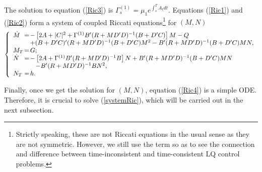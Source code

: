 \documentclass[final]{siamltex}
\begin{document}
The solution to equation (\ref{Ric3}) is $\Gamma^{(1)}_s=\mu_1 e^{\int_s^TA_tdt}$.
Equations (\ref{Ric1}) and (\ref{Ric2}) form a system of coupled Riccati equations\footnote{Strictly speaking, these are not
Riccati equations in the usual sense as they are not symmetric. However, we still use the term so as to see the connection and difference between
time-inconsistent and time-consistent LQ control problems.} for $(M,N)$
\begin{equation}\label{systemRic}
\left\{\begin{array}{lll}
\dot{M}\hspace{-0.3cm}&=&\hspace{-0.3cm}- \left[2A+|C|^2+\Gamma^{(1)} B'(R+MD'D)^{-1}(B+D'C)\right] M-Q\\
  &&\hspace{-0.3cm}+(B+D'C)'(R+MD'D)^{-1}(B+D'C)M^2-B'(R+MD'D)^{-1}(B+D'C)MN,\\
M_T\hspace{-0.3cm}&=&\hspace{-0.3cm} G;\\
\dot{ N}\hspace{-0.3cm}&=&\hspace{-0.3cm}- \left[2A+\Gamma^{(1)} B'(R+MD'D)^{-1}B\right] N+B'(R+MD'D)^{-1}(B+D'C)MN\\
   && -B'(R+MD'D)^{-1}BN^2,\\
 N_T\hspace{-0.3cm}&=&\hspace{-0.3cm}h.\\
\end{array}\right.
\end{equation}

Finally, once we get  the solution for $(M,N)$, equation (\ref{Ric4}) is a simple ODE.
Therefore, it is crucial to solve (\ref{systemRic}), which will be carried out in the next subsection.
\end{document}
